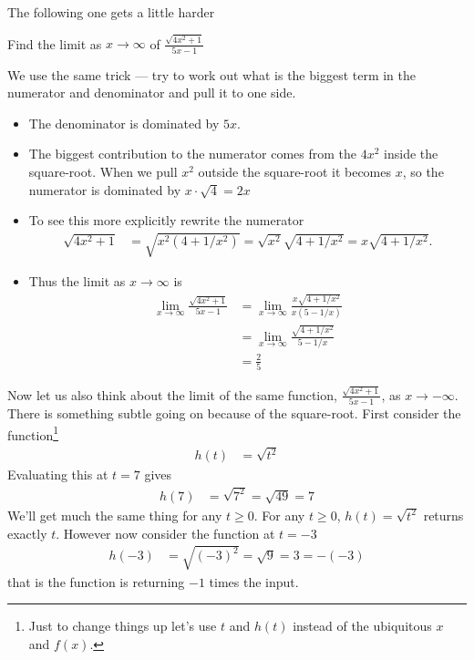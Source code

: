 The following one gets a little harder
\begin{eg}\label{eg lim tricky}
 Find the limit as $x \to \infty$ of $\frac{\sqrt{4x^2+1}}{5x-1}$

We use the same trick --- try to work out what is the biggest term in the
numerator and denominator and pull it to one side.
\begin{itemize}
 \item The denominator is dominated by $5x$.
 \item The biggest contribution to the numerator comes from the $4x^2$ inside
the square-root. When we pull $x^2$ outside the square-root it becomes $x$,
so the numerator is dominated by $x \cdot \sqrt{4} = 2x$
 \item To see this more explicitly rewrite the numerator
\begin{align*}
  \sqrt{4x^2+1} &= \sqrt{x^2 (4+1/x^2)} = \sqrt{x^2} \sqrt{4+1/x^2} =
x\sqrt{4+1/x^2}.
\end{align*}
\item Thus the limit as $x \to \infty$ is
\begin{align*}
 \lim_{x \to \infty} \frac{\sqrt{4x^2+1}}{5x-1}
 &= \lim_{x \to \infty} \frac{x \sqrt{4+1/x^2}}{x(5-1/x)}\\
 &= \lim_{x \to \infty} \frac{\sqrt{4+1/x^2}}{5-1/x} \\
 & = \frac{2}{5}
\end{align*}
\end{itemize}
\end{eg}

Now let us also think about the limit of the same function,
$\frac{\sqrt{4x^2+1}}{5x-1}$, as $x \rightarrow -\infty$. There is something
subtle going on because of the square-root. First consider the
function\footnote{Just to change things up let's use $t$ and $h(t)$ instead of
the ubiquitous $x$ and $f(x)$.}
\begin{align*}
  h(t) &= \sqrt{t^2}
\end{align*}
Evaluating this at $t=7$ gives
\begin{align*}
  h(7) &= \sqrt{ 7^2 } = \sqrt{49} = 7
\end{align*}
We'll get much the same thing for any $t \geq 0$. For any $t \ge 0$, $h(t)=\sqrt{t^2}$
returns exactly $t$. However now consider the function at $t=-3$
\begin{align*}
  h(-3) &= \sqrt{ (-3)^2 } = \sqrt{9} = 3 = - (-3)
\end{align*}
that is the function is returning $-1$ times the input.

